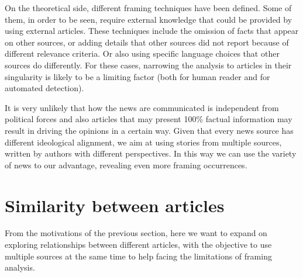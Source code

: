 On the theoretical side, different framing techniques have been defined. Some of them, in order to be seen, require external knowledge that could be provided by using external articles.
These techniques include the omission of facts that appear on other sources, or adding details that other sources did not report because of different relevance criteria.
Or also using specific language choices that other sources do differently.
For these cases, narrowing the analysis to articles in their singularity is likely to be a limiting factor (both for human reader and for automated detection).

It is very unlikely that how the news are communicated is independent from political forces and also articles that may present 100\% factual information may result in driving the opinions in a certain way.
Given that every news source has different ideological alignment, we aim at using stories from multiple sources, written by authors with different perspectives.
In this way we can use the variety of news to our advantage, revealing even more framing occurrences.





\section{Similarity between articles}
\label{sec:lit_relationships}

From the motivations of the previous section, here we want to expand on exploring relationships between different articles, with the objective to use multiple sources at the same time to help facing the limitations of framing analysis.



